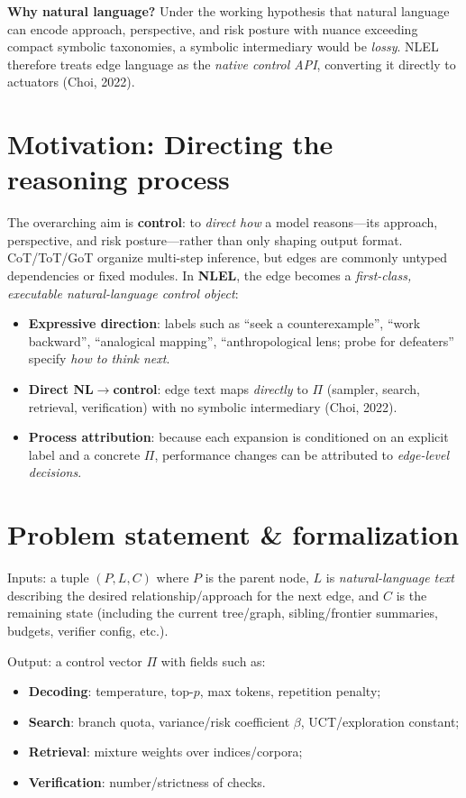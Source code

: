 \documentclass[11pt]{article}
\begin{document}
\medskip
\noindent\textbf{Why natural language?} Under the working hypothesis that natural language can encode approach, perspective, and risk posture with nuance exceeding compact symbolic taxonomies, a symbolic intermediary would be \emph{lossy}. NLEL therefore treats edge language as the \emph{native control API}, converting it directly to actuators (Choi, 2022).

\section{Motivation: Directing the reasoning process}
The overarching aim is \textbf{control}: to \emph{direct how} a model reasons---its approach, perspective, and risk posture---rather than only shaping output format. CoT/ToT/GoT organize multi-step inference, but edges are commonly untyped dependencies or fixed modules. In \textbf{NLEL}, the edge becomes a \emph{first-class, executable natural-language control object}:
\begin{itemize}[leftmargin=1.2em]
  \item \textbf{Expressive direction}: labels such as ``seek a counterexample'', ``work backward'', ``analogical mapping'', ``anthropological lens; probe for defeaters'' specify \emph{how to think next}.
  \item \textbf{Direct NL$\to$control}: edge text maps \emph{directly} to $\Pi$ (sampler, search, retrieval, verification) with no symbolic intermediary (Choi, 2022).
  \item \textbf{Process attribution}: because each expansion is conditioned on an explicit label and a concrete $\Pi$, performance changes can be attributed to \emph{edge-level decisions}.
\end{itemize}

\section{Problem statement \& formalization}
Inputs: a tuple $(P,L,C)$ where $P$ is the parent node, $L$ is \emph{natural-language text} describing the desired relationship/approach for the next edge, and $C$ is the remaining state (including the current tree/graph, sibling/frontier summaries, budgets, verifier config, etc.).

\medskip
\noindent Output: a control vector $\Pi$ with fields such as:
\begin{itemize}[leftmargin=1.2em]
  \item \textbf{Decoding}: temperature, top-$p$, max tokens, repetition penalty;
  \item \textbf{Search}: branch quota, variance/risk coefficient $\beta$, UCT/exploration constant;
  \item \textbf{Retrieval}: mixture weights over indices/corpora;
  \item \textbf{Verification}: number/strictness of checks.
\end{itemize}
\end{document}
